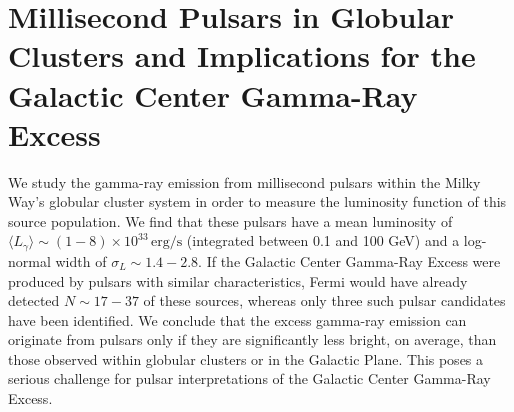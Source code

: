 %
\chapter{Millisecond Pulsars in Globular Clusters and Implications for the Galactic Center Gamma-Ray Excess}
\label{ch:msp}

We study the gamma-ray emission from millisecond pulsars within the Milky Way's globular cluster system in order to measure the luminosity function of this source population. We find that these pulsars have a mean luminosity of
$\langle L_{\gamma}\rangle \sim (1-8)\times 10^{33}\, \textrm{erg/s}$ (integrated between 0.1 and 100 GeV) and a log-normal width of $\sigma_L \sim 1.4-2.8$. If the Galactic Center Gamma-Ray Excess were produced by pulsars with similar characteristics, Fermi would have already detected $N \sim 17-37$ of these sources, whereas only three such pulsar candidates have been identified. We conclude that the excess gamma-ray emission can originate from pulsars only if they are significantly less bright, on average, than those observed within globular clusters or in the Galactic Plane. This poses a serious challenge for pulsar interpretations of the Galactic Center Gamma-Ray Excess.









\begin{subappendices}


\end{subappendices}
